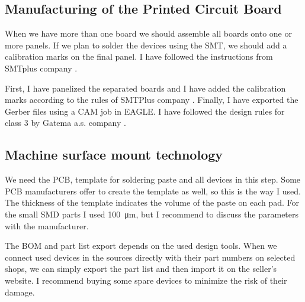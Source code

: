 \subsection{Manufacturing of the Printed Circuit Board}
When we have more than one board we should assemble all boards onto one or more panels. If we plan to solder the devices using the \ac{SMT}, we should add a calibration marks on the final panel. I have followed the instructions from SMTplus company \cite{SMTplusManual}.

First, I have panelized the separated boards and I have added the calibration marks according to the rules of SMTPlus company \cite{SMTPlusDesignRules}. Finally, I have exported the Gerber files using a CAM job \cite{GatemaCAMjob} in \ac{EAGLE}. I have followed the design rules for class 3 by Gatema a.s. company \cite{GatemaDesignRules}.

\subsection{Machine surface mount technology}
We need the \ac{PCB}, template for soldering paste and all devices in this step. Some \ac{PCB} manufacturers offer to create the template as well, so this is the way I used. The thickness of the template indicates the volume of the paste on each pad. For the small \ac{SMD} parts I used \SI{100}{\micro\meter}, but I recommend to discuss the parameters with the manufacturer.

The \ac{BOM} and part list export depends on the used design tools. When we connect used devices in the sources directly with their part numbers on selected shops, we can simply export the part list and then import it on the seller's website. I recommend buying some spare devices to minimize the risk of their damage.

